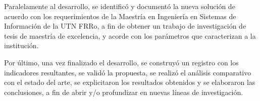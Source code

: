 \bigskip Paralelamente al desarrollo, se identificó y documentó la nueva solución de acuerdo con los requerimientos de la Maestría en Ingeniería en Sistemas de Información de la UTN FRRo, a fin de obtener un trabajo de investigación de tesis de maestría de excelencia, y acorde con los parámetros que caracterizan a la institución.

\bigskip Por último, una vez finalizado el desarrollo, se construyó un registro con los indicadores resultantes, se validó la propuesta, se realizó el análisis comparativo con el estado del arte, se explicitaron los resultados obtenidos y se elaboraron las conclusiones, a fin de abrir y/o profundizar en nuevas líneas de investigación.